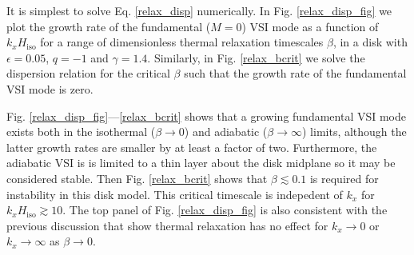 It is simplest to solve Eq. \ref{relax_disp} numerically. In
Fig. \ref{relax_disp_fig} we plot the growth rate of the fundamental
($M=0$) VSI mode as a function of $k_xH_\mathrm{iso}$ for a range of
dimensionless thermal relaxation timescales $\beta$, in a disk with
$\epsilon=0.05$, $q=-1$ and $\gamma=1.4$.  Similarly, 
in Fig. \ref{relax_bcrit} we solve the dispersion relation for the
critical $\beta$ such that the growth rate of the fundamental VSI mode
is zero.  

Fig. \ref{relax_disp_fig}---\ref{relax_bcrit} shows that a growing fundamental
VSI mode exists both in the isothermal ($\beta\to0$) and adiabatic
($\beta\to\infty$) limits, although the latter growth rates are
smaller by at least a factor of two. Furthermore, the adiabatic VSI is 
is limited to a thin layer about the disk midplane so it may be
considered stable. Then Fig. \ref{relax_bcrit} shows that 
$\beta\lesssim 0.1$ is required for instability in this disk model. This critical
timescale is indepedent of $k_x$ for
$k_xH_\mathrm{iso}\gtrsim10$. The top panel of Fig. \ref{relax_disp_fig} is also
consistent with the previous
discussion that show thermal relaxation has no effect for
$k_x\to0$ or $k_x\to\infty$ as $\beta\to0$. 

